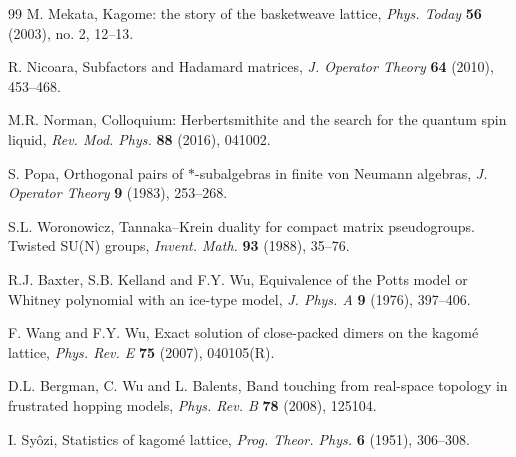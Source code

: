 \documentclass[11pt,a4paper]{amsart}
\begin{document}
{\begin{thebibliography}{99}
 M. Mekata, Kagome: the story of the basketweave lattice, {\em Phys. Today} {\bf 56} (2003), no. 2, 12--13.

 R. Nicoara, Subfactors and Hadamard matrices, {\em J. Operator Theory} {\bf 64} (2010), 453--468.

 M.R. Norman, Colloquium: Herbertsmithite and the search for the quantum spin liquid, {\em Rev. Mod. Phys.} {\bf 88} (2016), 041002.

 S. Popa, Orthogonal pairs of $*$-subalgebras in finite von Neumann algebras, {\em J. Operator Theory} {\bf 9} (1983), 253--268.

 S.L. Woronowicz, Tannaka--Krein duality for compact matrix pseudogroups. Twisted SU(N) groups, {\em Invent. Math.} {\bf 93} (1988), 35--76.

 R.J. Baxter, S.B. Kelland and F.Y. Wu, Equivalence of the Potts model or Whitney polynomial with an ice-type model, {\em J. Phys. A} {\bf 9} (1976), 397--406.

 F. Wang and F.Y. Wu, Exact solution of close-packed dimers on the kagom\'e lattice, {\em Phys. Rev. E} {\bf 75} (2007), 040105(R).

 D.L. Bergman, C. Wu and L. Balents, Band touching from real-space topology in frustrated hopping models, {\em Phys. Rev. B} {\bf 78} (2008), 125104.

 I. Sy\^ozi, Statistics of kagom\'e lattice, {\em Prog. Theor. Phys.} {\bf 6} (1951), 306--308.

\end{thebibliography}}
\end{document}
